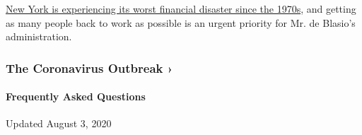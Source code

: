 \href{https://www.nytimes.com/2020/07/07/nyregion/nyc-unemployment.html}{New
York is experiencing its worst financial disaster since the 1970s}, and
getting as many people back to work as possible is an urgent priority
for Mr. de Blasio's administration.

\href{https://www.nytimes.com/news-event/coronavirus?action=click\&pgtype=Article\&state=default\&region=MAIN_CONTENT_3\&context=storylines_faq}{}

\hypertarget{the-coronavirus-outbreak-}{%
\subsubsection{The Coronavirus Outbreak
›}\label{the-coronavirus-outbreak-}}

\hypertarget{frequently-asked-questions}{%
\paragraph{Frequently Asked
Questions}\label{frequently-asked-questions}}

Updated August 3, 2020

